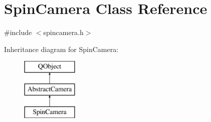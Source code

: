 \hypertarget{class_spin_camera}{}\section{Spin\+Camera Class Reference}
\label{class_spin_camera}


{\ttfamily \#include $<$spincamera.\+h$>$}

Inheritance diagram for Spin\+Camera\+:\begin{figure}[H]
\begin{center}
\leavevmode
\includegraphics[height=3.000000cm]{class_spin_camera}
\end{center}
\end{figure}
